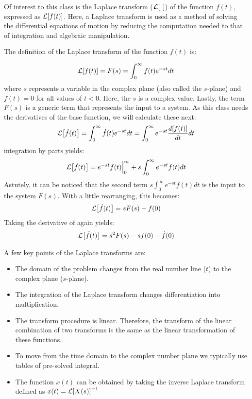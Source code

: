\documentclass[12pt,letter]{article}
\begin{document}
\begin{review}
		
		Of interest to this class is the Laplace transform ($\mathcal{L}{\left[\hspace{1ex}\right]}$) of the function $f(t)$, expressed as $\mathcal{L}{\left[f(t)\right]}$. Here, a Laplace transform is used as a method of solving the differential equations of motion by reducing the computation needed to that of integration and algebraic manipulation. 
		
		The definition of the Laplace transform of the function $f(t)$ is:
		
		\begin{equation}
				\mathcal{L}{\left[f(t)\right]} = F(s) = \int_{0}^{\infty} f(t)e^{-st}dt
		\end{equation}
		where $s$ represents a variable in the complex plane (also called the $s$-plane) and $f(t)=0$ for all values of $t<0$. Here, the $s$ is a complex value. Lastly, the term $F(s)$ is a generic term that represents the input to a system. As this class needs the derivatives of the base function, we will calculate these next:
		\begin{equation}
			\mathcal{L}{\left[\dot{f}(t)\right]} = \int_{0}^{\infty} \dot{f}(t)e^{-st}dt = \int_{0}^{\infty} e^{-st}\frac{d[f(t)]}{dt}dt 
		\end{equation}		
		integration by parts yields:
		\begin{equation}
			\mathcal{L}{\left[\dot{f}(t)\right]} = e^{-st}f(t)\Big|_0^\infty+s\int_{0}^{\infty}e^{-st}f(t)dt
		\end{equation}
		Astutely, it can be noticed that the second term $s\int_{0}^{\infty}e^{-st}f(t)dt$
		is the input to the system $F(s)$. With a little rearranging, this becomes:
		\begin{equation}
			\mathcal{L}{\left[\dot{f}(t)\right]} = sF(s)-f(0)
		\end{equation}
		Taking the derivative of again yields:
		\begin{equation}
			\mathcal{L}{\left[\ddot{f}(t)\right]} = s^2F(s)-sf(0)-\dot{f}(0)
		\end{equation}
		
		A few key points of the Laplace transforms are:
				
		\begin{itemize}
			\item The domain of the problem changes from the real number line ($t$) to the complex plane ($s$-plane).
			\item The integration of the Laplace transform changes differentiation into multiplication.
			\item The transform procedure is linear. Therefore, the transform of the linear combination of two transforms is the same as the linear transformation of these functions. 
			\item To move from the time domain to the complex number plane we typically use tables of pre-solved integral. 
			\item The function $x(t)$ can be obtained by taking the inverse Laplace transform defined as $x(t) = \mathcal{L}{\left[X(s)\right]}^{-1}$
		\end{itemize}


\end{review}
\end{document}
